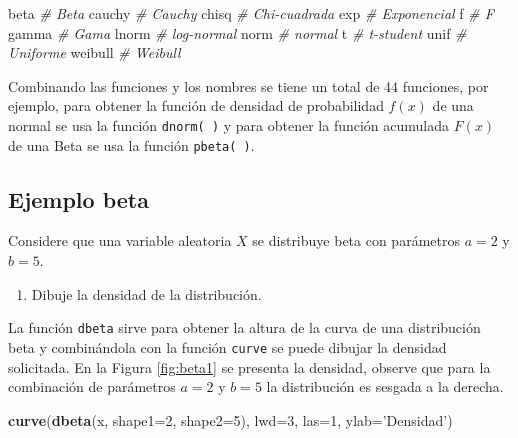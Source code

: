 \documentclass[10pt,]{krantz}
\makeatletter
\newenvironment{Shaded}{\begin{snugshade}}{\end{snugshade}}
\newcommand{\KeywordTok}[1]{\textcolor[rgb]{0.13,0.29,0.53}{\textbf{{#1}}}}
\newcommand{\DataTypeTok}[1]{\textcolor[rgb]{0.13,0.29,0.53}{{#1}}}
\newcommand{\DecValTok}[1]{\textcolor[rgb]{0.00,0.00,0.81}{{#1}}}
\newcommand{\StringTok}[1]{\textcolor[rgb]{0.31,0.60,0.02}{{#1}}}
\newcommand{\CommentTok}[1]{\textcolor[rgb]{0.56,0.35,0.01}{\textit{{#1}}}}
\newcommand{\NormalTok}[1]{{#1}}
\providecommand{\tightlist}{%
  \setlength{\itemsep}{0pt}\setlength{\parskip}{0pt}}
\newenvironment{kframe}{%
\medskip{}
\setlength{\fboxsep}{.8em}
 \def\at@end@of@kframe{}%
 \ifinner\ifhmode%
  \def\at@end@of@kframe{\end{minipage}}%
  \begin{minipage}{\columnwidth}%
 \fi\fi%
 \def\FrameCommand##1{\hskip\@totalleftmargin \hskip-\fboxsep
 \colorbox{shadecolor}{##1}\hskip-\fboxsep
     \hskip-\linewidth \hskip-\@totalleftmargin \hskip\columnwidth}%
 \MakeFramed {\advance\hsize-\width
   \@totalleftmargin\z@ \linewidth\hsize
   \@setminipage}}%
 {\par\unskip\endMakeFramed%
 \at@end@of@kframe}
\renewenvironment{Shaded}{\begin{kframe}}{\end{kframe}}
\makeatother
\begin{document}
\begin{Shaded}
\begin{Highlighting}[]
\NormalTok{beta     }\CommentTok{# Beta}
\NormalTok{cauchy   }\CommentTok{# Cauchy}
\NormalTok{chisq    }\CommentTok{# Chi-cuadrada}
\NormalTok{exp      }\CommentTok{# Exponencial}
\NormalTok{f        }\CommentTok{# F}
\NormalTok{gamma    }\CommentTok{# Gama}
\NormalTok{lnorm    }\CommentTok{# log-normal}
\NormalTok{norm     }\CommentTok{# normal}
\NormalTok{t        }\CommentTok{# t-student}
\NormalTok{unif     }\CommentTok{# Uniforme}
\NormalTok{weibull  }\CommentTok{# Weibull}
\end{Highlighting}
\end{Shaded}

Combinando las funciones y los nombres se tiene un total de 44
funciones, por ejemplo, para obtener la función de densidad de
probabilidad \(f(x)\) de una normal se usa la función \texttt{dnorm(\ )}
y para obtener la función acumulada \(F(x)\) de una Beta se usa la
función \texttt{pbeta(\ )}.

\subsection*{Ejemplo beta}\label{ejemplo-beta}


Considere que una variable aleatoria \(X\) se distribuye beta con
parámetros \(a=2\) y \(b=5\).

\begin{enumerate}
\def\labelenumi{\arabic{enumi})}
\tightlist
\item
  Dibuje la densidad de la distribución.
\end{enumerate}

La función \texttt{dbeta} sirve para obtener la altura de la curva de
una distribución beta y combinándola con la función \texttt{curve} se
puede dibujar la densidad solicitada. En la Figura \ref{fig:beta1} se
presenta la densidad, observe que para la combinación de parámetros
\(a=2\) y \(b=5\) la distribución es sesgada a la derecha.

\begin{Shaded}
\begin{Highlighting}[]
\KeywordTok{curve}\NormalTok{(}\KeywordTok{dbeta}\NormalTok{(x, }\DataTypeTok{shape1=}\DecValTok{2}\NormalTok{, }\DataTypeTok{shape2=}\DecValTok{5}\NormalTok{), }\DataTypeTok{lwd=}\DecValTok{3}\NormalTok{, }\DataTypeTok{las=}\DecValTok{1}\NormalTok{,}
      \DataTypeTok{ylab=}\StringTok{'Densidad'}\NormalTok{)}
\end{Highlighting}
\end{Shaded}
\end{document}

